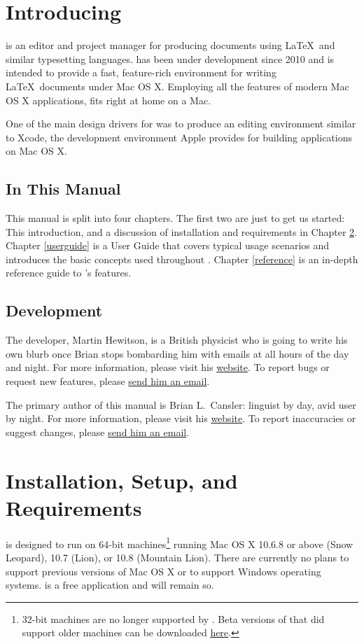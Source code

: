\chapter{Introducing \texnicle}
\label{intro}
\texnicle is an editor and project manager for producing documents using \LaTeX\ and similar typesetting languages. \texnicle has been under development since 2010 and is intended to provide a fast, feature-rich environment for writing \LaTeX\ documents under Mac OS X. Employing all the features of modern Mac OS X applications, \texnicle fits right at home on a Mac.

One of the main design drivers for \texnicle was to produce an editing environment similar to Xcode, the development environment Apple provides for building applications on Mac OS X.

\section{In This Manual}
\label{inthismanual}
This manual is split into four chapters. The first two are just to get us started: This introduction, and a discussion of installation and requirements in Chapter \ref{requirements}. Chapter \ref{userguide} is a User Guide that covers typical usage scenarios and introduces the basic concepts used throughout \texnicle. Chapter \ref{reference} is an in-depth reference guide to \texnicle's features.

\section{Development}
\label{dev}
The developer, Martin Hewitson, is a British physicist who is going to write his own blurb once Brian stops bombarding him with emails at all hours of the day and night. For more information, please visit his \href{http://bobsoft-mac.de}{website}. To report bugs or request new features, please \href{mailto:martin@bobsoft-mac.de}{send him an email}.

The primary author of this manual is Brian L.\ Cansler: linguist by day, avid \texnicle user by night. For more information, please visit his \href{http://unc.edu/~bcansler}{website}. To report inaccuracies or suggest changes, please \href{mailto:bcansler@me.com}{send him an email}.

\chapter{Installation, Setup, and Requirements}
\label{requirements}
\texnicle is designed to run on 64-bit machines\footnote{32-bit machines are no longer supported by \texnicle. Beta versions of \texnicle that did support older machines can be downloaded \href{http://bobsoft-mac.de}{here}.} running Mac OS X 10.6.8 or above (Snow Leopard), 10.7 (Lion), or 10.8 (Mountain Lion). There are currently no plans to support previous versions of Mac OS X or to support Windows operating systems. \texnicle is a free application and will remain so.


